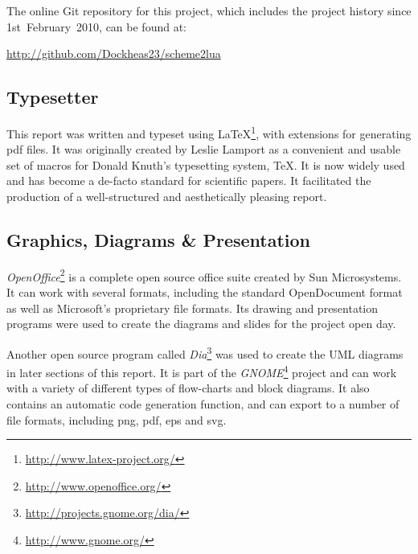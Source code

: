 The online Git repository for this project, which includes the project history
since 1st~February~2010, can be found at:
\begin{center}\url{http://github.com/Dockheas23/scheme2lua}\end{center}

\subsection{Typesetter}

This report was written and typeset using
\LaTeX\footnote{\url{http://www.latex-project.org/}}, with extensions for
generating pdf files. It was originally created by Leslie Lamport as a
convenient and usable set of macros for Donald Knuth's typesetting system, \TeX.
It is now widely used and has become a de-facto standard for scientific papers.
It facilitated the production of a well-structured and aesthetically pleasing
report.

\subsection{Graphics, Diagrams \& Presentation}

\emph{OpenOffice}\footnote{\url{http://www.openoffice.org/}} is a complete open
source office suite created by Sun Microsystems.  It can work with several
formats, including the standard OpenDocument format as well as Microsoft's
proprietary file formats. Its drawing and presentation programs were used to
create the diagrams and slides for the project open day.

Another open source program called
\emph{Dia}\footnote{\url{http://projects.gnome.org/dia/}} was used to create the
UML diagrams in later sections of this report. It is part of the
\emph{GNOME}\footnote{\url{http://www.gnome.org/}} project and can work with a
variety of different types of flow-charts and block diagrams. It also contains
an automatic code generation function, and can export to a number of file
formats, including png, pdf, eps and svg.

